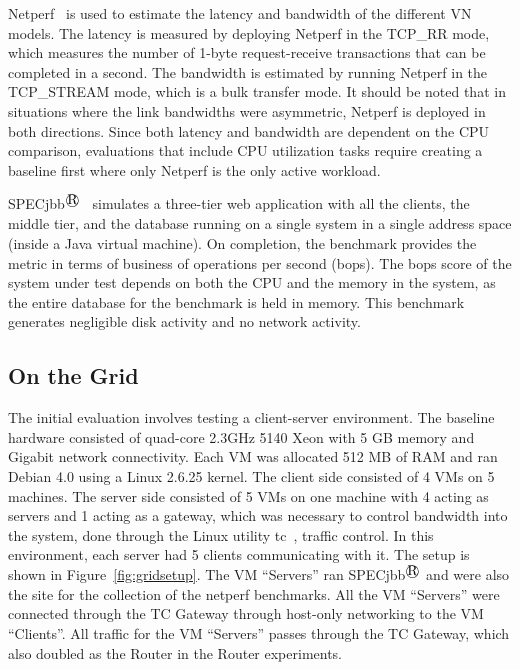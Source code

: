 Netperf~\cite{netperf} is used to estimate the latency and bandwidth of the
different VN models. The latency is measured by deploying Netperf in the
TCP\_RR mode, which measures the number of 1-byte request-receive transactions
that can be completed in a second. The bandwidth is estimated by running Netperf
in the TCP\_STREAM mode, which is a bulk transfer mode. It should be noted that
in situations where the link bandwidths were asymmetric, Netperf is deployed in
both directions.  Since both latency and bandwidth are dependent on the CPU
comparison, evaluations that include CPU utilization tasks require creating
a baseline first where only Netperf is the only active workload.

SPECjbb$^\registered$~\cite{specjbb} simulates a three-tier web application with all the
clients, the middle tier, and the database running on a single system in a
single address space (inside a Java virtual machine). On completion, the
benchmark provides the metric in terms of business of operations per second
(bops). The bops score of the system under test depends on both the CPU and the
memory in the system, as the entire database for the benchmark is held in
memory. This benchmark generates negligible disk activity and no network
activity. 

\subsection{On the Grid}

The initial evaluation involves testing a client-server environment.  The
baseline hardware consisted of quad-core 2.3GHz 5140 Xeon with 5 GB memory and
Gigabit network connectivity.  Each VM was allocated 512 MB of RAM and ran
Debian 4.0 using a Linux 2.6.25 kernel.  The client side consisted of 4 VMs on
5 machines.  The server side consisted of 5 VMs on one machine with 4 acting as
servers and 1 acting as a gateway, which was necessary to control bandwidth
into the system, done through the Linux utility tc~\cite{tc}, traffic control.
In this environment, each server had 5 clients communicating with it.  The
setup is shown in Figure~\ref{fig:gridsetup}.  The VM ``Servers'' ran
SPECjbb$^\registered$ and were also the site for the collection of the netperf
benchmarks.  All the VM ``Servers'' were connected through the TC Gateway
through host-only networking to the VM ``Clients''.  All traffic for the VM
``Servers'' passes through the TC Gateway, which also doubled as the Router in
the Router experiments.

